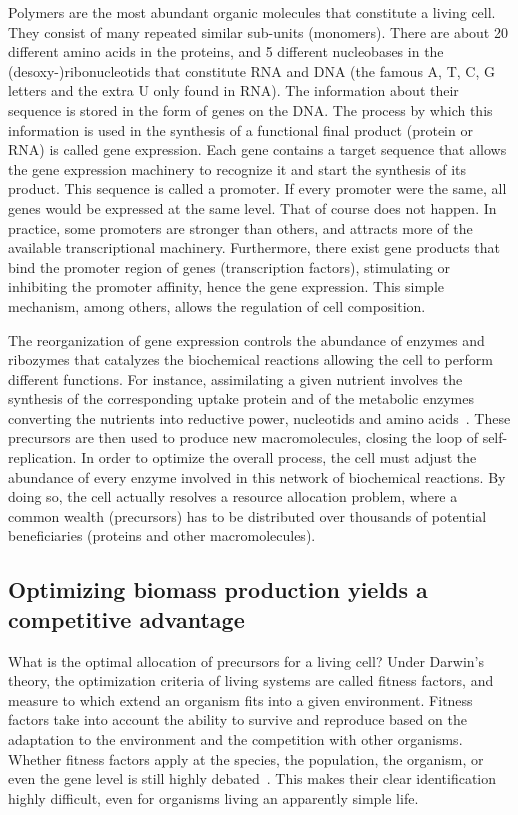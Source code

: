 Polymers are the most abundant organic molecules that constitute a living cell.
They consist of many repeated similar sub-units (monomers).
There are about 20 different amino acids in the proteins, and 5 different nucleobases in the (desoxy-)ribonucleotids that constitute RNA and DNA (the famous A, T, C, G letters and the extra U only found in RNA).
The information about their sequence is stored in the form of genes on the DNA.
The process by which this information is used in the synthesis of a functional final product (protein or RNA) is called gene expression.
Each gene contains a target sequence that allows the gene expression machinery to recognize it and start the synthesis of its product.
This sequence is called a promoter.
If every promoter were the same, all genes would be expressed at the same level.
That of course does not happen.
In practice, some promoters are stronger than others, and attracts more of the available transcriptional machinery.
Furthermore, there exist gene products that bind the promoter region of genes (transcription factors), stimulating or inhibiting the promoter affinity, hence the gene expression.
This simple mechanism, among others, allows the regulation of cell composition.

The reorganization of gene expression controls the abundance of enzymes and ribozymes that catalyzes the biochemical reactions allowing the cell to perform different functions.
For instance, assimilating a given nutrient involves the synthesis of the corresponding uptake protein and of the metabolic enzymes converting the nutrients into reductive power, nucleotids and amino acids~\cite{schaechter_microbe_2006}.
These precursors are then used to produce new macromolecules, closing the loop of self-replication.
In order to optimize the overall process, the cell must adjust the abundance of every enzyme involved in this network of biochemical reactions.
By doing so, the cell actually resolves a resource allocation problem, where a common wealth (precursors) has to be distributed over thousands of potential beneficiaries (proteins and other macromolecules).

\subsection{Optimizing biomass production yields a competitive advantage}

What is the optimal allocation of precursors for a living cell?
Under Darwin's theory, the optimization criteria of living systems are called fitness factors, and measure to which extend an organism fits into a given environment.
Fitness factors take into account the ability to survive and reproduce based on the adaptation to the environment and the competition with other organisms.
Whether fitness factors apply at the species, the population, the organism, or even the gene level is still highly debated~\cite{dawkins_selfish_1976}.
This makes their clear identification highly difficult, even for organisms living an apparently simple life.

